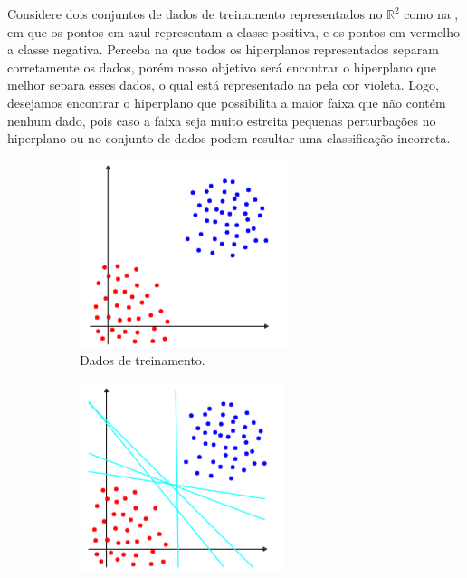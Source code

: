 \documentclass[12pt,a4paper]{scrartcl}
\def\RR{\mathds{R}}
\theoremstyle{definition}%
\begin{document}
Considere dois conjuntos de dados de treinamento representados no $\RR^2$ como na , em que os pontos em azul representam a classe positiva, e os pontos em vermelho a classe negativa. Perceba na  que todos os hiperplanos representados separam corretamente os dados, porém nosso objetivo será encontrar o hiperplano que melhor separa esses dados, o qual está representado na  pela cor violeta. Logo, desejamos encontrar o hiperplano que possibilita a maior faixa que não contém nenhum dado, pois caso a faixa seja muito estreita pequenas perturbações no hiperplano ou no conjunto de dados podem resultar uma classificação incorreta. 
\begin{figure}[htbp] 
	\centering
	\begin{subfigure}[h]{0.4\textwidth}
		\centering
		\includegraphics[width=\textwidth]{dados_treinamento}
		\caption{Dados de treinamento. \label{fig2:a}}
	\end{subfigure}
	\begin{subfigure}[h]{0.38\textwidth}
		\centering
		\includegraphics[width=\textwidth]{hiperplanos_separadores}

\end{subfigure}
\end{figure}
\end{document}
